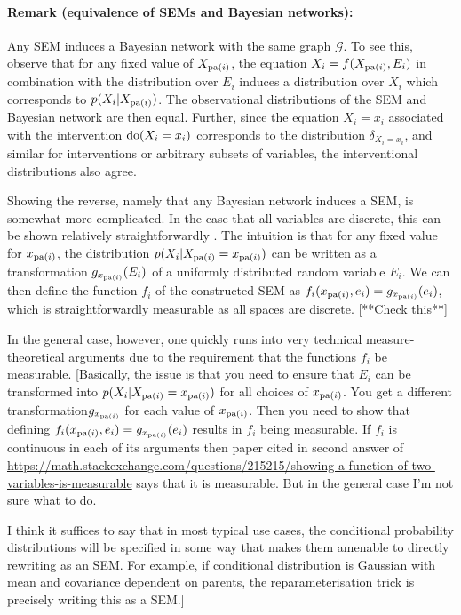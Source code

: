 \paragraph{Remark (equivalence of SEMs and Bayesian networks):} Any SEM induces a Bayesian network with the same graph $\mathcal{G}$.
To see this, observe that for any fixed value of $X_{\operatorname{pa}(i)}$, the equation $X_i = f(X_{\operatorname{pa}(i)} , E_i)$ in combination with the distribution over $E_i$ induces a distribution over $X_i$ which corresponds to $p(X_i | X_{\operatorname{pa}(i)})$. The observational distributions of the SEM and Bayesian network are then equal. Further, since the equation $X_i=x_i$ associated with the intervention $\operatorname{do}(X_i = x_i)$ corresponds to the distribution $\delta_{X_i = x_i}$, and similar for interventions or arbitrary subsets of variables, the interventional distributions also agree.

Showing the reverse, namely that any Bayesian network induces a SEM, is somewhat more complicated. In the case that all variables are discrete, this can be shown relatively straightforwardly \cite{druzdzel1993causality}. The intuition is that for any fixed value for $x_{\operatorname{pa}(i)}$,  the distribution $p(X_i | X_{\operatorname{pa}(i)}=x_{\operatorname{pa}(i)})$ can be written as a transformation $g_{x_{\operatorname{pa}(i)}}(E_i)$ of a uniformly distributed random variable $E_i$. We can then define the function $f_i$ of the constructed SEM as $f_i(x_{\operatorname{pa}(i)}, e_i) = g_{x_{\operatorname{pa}(i)}}(e_i)$, which is straightforwardly measurable as all spaces are discrete. [**Check this**]

In the general case, however, one quickly runs into very technical measure-theoretical arguments due to the requirement that the functions $f_i$ be measurable. [Basically, the issue is that you need to ensure that $E_i$ can be transformed into $p(X_i | X_{\operatorname{pa}(i)}=x_{\operatorname{pa}(i)})$ for all choices of $x_{\operatorname{pa}(i)}$. You get a different transformation$g_{x_{\operatorname{pa}(i)}}$ for each value of $x_{\operatorname{pa}(i)}$. Then you need to show that defining $f_i(x_{\operatorname{pa}(i)}, e_i) = g_{x_{\operatorname{pa}(i)}}(e_i)$ results in $f_i$ being measurable. If $f_i$ is continuous in each of its arguments then paper cited in second answer of \url{https://math.stackexchange.com/questions/215215/showing-a-function-of-two-variables-is-measurable} says that it is measurable. But in the general case I'm not sure what to do. 

I think it suffices to say that in most typical use cases, the conditional probability distributions will be specified in some way that makes them amenable to directly rewriting as an SEM. For example, if conditional distribution is Gaussian with mean and covariance dependent on parents, the reparameterisation trick is precisely writing this as a SEM.]
\\




